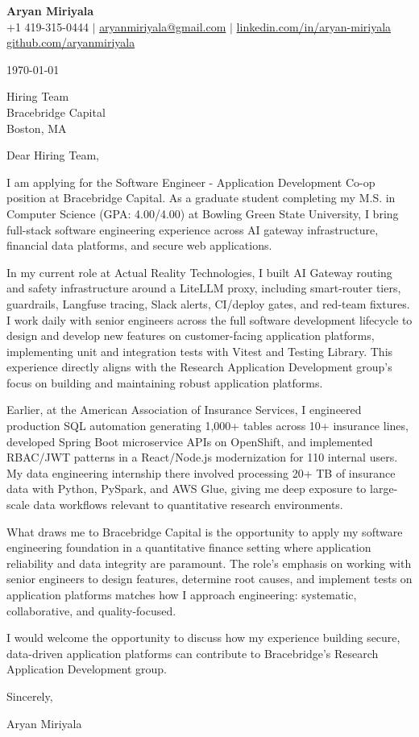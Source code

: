 \documentclass[letterpaper,11pt]{article}
\begin{document}
\begin{center}
  {\LARGE \textbf{Aryan Miriyala}}\\[2pt]
  \small
  +1 419-315-0444 $|$ \href{mailto:aryanmiriyala@gmail.com}{aryanmiriyala@gmail.com} $|$ \href{https://www.linkedin.com/in/aryan-miriyala-7788a21b6/}{linkedin.com/in/aryan-miriyala}\\
  \href{https://github.com/aryanmiriyala}{github.com/aryanmiriyala}
\end{center}\vspace{12pt}

\today\vspace{12pt}

Hiring Team\\
Bracebridge Capital\\
Boston, MA\vspace{12pt}

Dear Hiring Team,

I am applying for the Software Engineer - Application Development Co-op position at Bracebridge Capital. As a graduate student completing my M.S. in Computer Science (GPA: 4.00/4.00) at Bowling Green State University, I bring full-stack software engineering experience across AI gateway infrastructure, financial data platforms, and secure web applications.

In my current role at Actual Reality Technologies, I built AI Gateway routing and safety infrastructure around a LiteLLM proxy, including smart-router tiers, guardrails, Langfuse tracing, Slack alerts, CI/deploy gates, and red-team fixtures. I work daily with senior engineers across the full software development lifecycle to design and develop new features on customer-facing application platforms, implementing unit and integration tests with Vitest and Testing Library. This experience directly aligns with the Research Application Development group's focus on building and maintaining robust application platforms.

Earlier, at the American Association of Insurance Services, I engineered production SQL automation generating 1,000+ tables across 10+ insurance lines, developed Spring Boot microservice APIs on OpenShift, and implemented RBAC/JWT patterns in a React/Node.js modernization for 110 internal users. My data engineering internship there involved processing 20+ TB of insurance data with Python, PySpark, and AWS Glue, giving me deep exposure to large-scale data workflows relevant to quantitative research environments.

What draws me to Bracebridge Capital is the opportunity to apply my software engineering foundation in a quantitative finance setting where application reliability and data integrity are paramount. The role's emphasis on working with senior engineers to design features, determine root causes, and implement tests on application platforms matches how I approach engineering: systematic, collaborative, and quality-focused.

I would welcome the opportunity to discuss how my experience building secure, data-driven application platforms can contribute to Bracebridge's Research Application Development group.

\vspace{12pt}

Sincerely,

Aryan Miriyala
\end{document}
